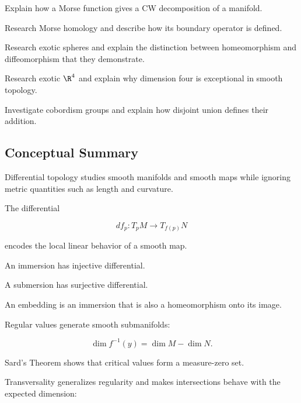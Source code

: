\begin{exercise}[4]
Explain how a Morse function gives a CW decomposition of a manifold.
\end{exercise}

\begin{exercise}[4]
Research Morse homology and describe how its boundary operator is defined.
\end{exercise}

\begin{exercise}[4]
Research exotic spheres and explain the distinction between homeomorphism
and diffeomorphism that they demonstrate.
\end{exercise}

\begin{exercise}[4]
Research exotic \(\R^4\) and explain why dimension four is exceptional in
smooth topology.
\end{exercise}

\begin{exercise}[4]
Investigate cobordism groups and explain how disjoint union defines their
addition.
\end{exercise}

\subsection{Conceptual Summary}
\label{subsec:differential-topology-summary}

Differential topology studies smooth manifolds and smooth maps while
ignoring metric quantities such as length and curvature.

The differential

\[
\boxed{
df_p:T_pM\to T_{f(p)}N
}
\]

encodes the local linear behavior of a smooth map.

An immersion has injective differential.

A submersion has surjective differential.

An embedding is an immersion that is also a homeomorphism onto its image.

Regular values generate smooth submanifolds:

\[
\boxed{
\dim f^{-1}(y)
=
\dim M-\dim N.
}
\]

Sard's Theorem shows that critical values form a measure-zero set.

Transversality generalizes regularity and makes intersections behave with
the expected dimension:

